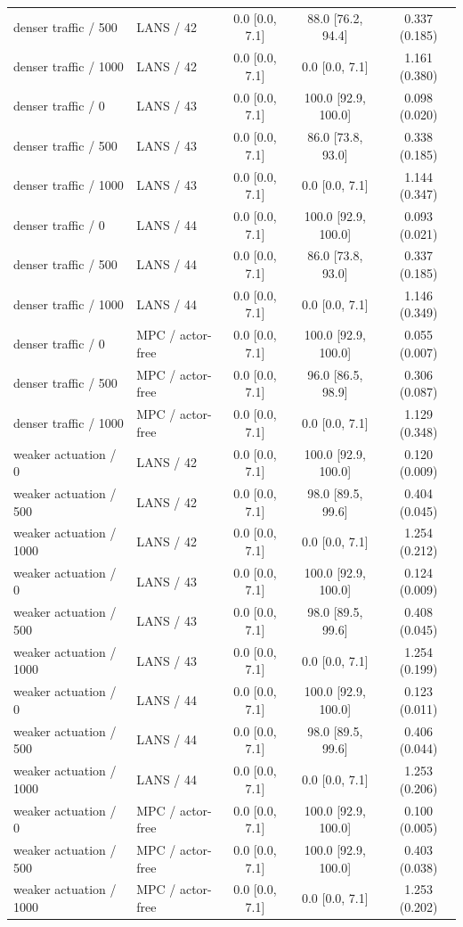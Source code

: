\begin{longtable}{llccc}
denser traffic / 500 & LANS / 42 & 0.0 [0.0, 7.1] & 88.0 [76.2, 94.4] & 0.337 (0.185) \\
denser traffic / 1000 & LANS / 42 & 0.0 [0.0, 7.1] & 0.0 [0.0, 7.1] & 1.161 (0.380) \\
denser traffic / 0 & LANS / 43 & 0.0 [0.0, 7.1] & 100.0 [92.9, 100.0] & 0.098 (0.020) \\
denser traffic / 500 & LANS / 43 & 0.0 [0.0, 7.1] & 86.0 [73.8, 93.0] & 0.338 (0.185) \\
denser traffic / 1000 & LANS / 43 & 0.0 [0.0, 7.1] & 0.0 [0.0, 7.1] & 1.144 (0.347) \\
denser traffic / 0 & LANS / 44 & 0.0 [0.0, 7.1] & 100.0 [92.9, 100.0] & 0.093 (0.021) \\
denser traffic / 500 & LANS / 44 & 0.0 [0.0, 7.1] & 86.0 [73.8, 93.0] & 0.337 (0.185) \\
denser traffic / 1000 & LANS / 44 & 0.0 [0.0, 7.1] & 0.0 [0.0, 7.1] & 1.146 (0.349) \\
denser traffic / 0 & MPC / actor-free & 0.0 [0.0, 7.1] & 100.0 [92.9, 100.0] & 0.055 (0.007) \\
denser traffic / 500 & MPC / actor-free & 0.0 [0.0, 7.1] & 96.0 [86.5, 98.9] & 0.306 (0.087) \\
denser traffic / 1000 & MPC / actor-free & 0.0 [0.0, 7.1] & 0.0 [0.0, 7.1] & 1.129 (0.348) \\
weaker actuation / 0 & LANS / 42 & 0.0 [0.0, 7.1] & 100.0 [92.9, 100.0] & 0.120 (0.009) \\
weaker actuation / 500 & LANS / 42 & 0.0 [0.0, 7.1] & 98.0 [89.5, 99.6] & 0.404 (0.045) \\
weaker actuation / 1000 & LANS / 42 & 0.0 [0.0, 7.1] & 0.0 [0.0, 7.1] & 1.254 (0.212) \\
weaker actuation / 0 & LANS / 43 & 0.0 [0.0, 7.1] & 100.0 [92.9, 100.0] & 0.124 (0.009) \\
weaker actuation / 500 & LANS / 43 & 0.0 [0.0, 7.1] & 98.0 [89.5, 99.6] & 0.408 (0.045) \\
weaker actuation / 1000 & LANS / 43 & 0.0 [0.0, 7.1] & 0.0 [0.0, 7.1] & 1.254 (0.199) \\
weaker actuation / 0 & LANS / 44 & 0.0 [0.0, 7.1] & 100.0 [92.9, 100.0] & 0.123 (0.011) \\
weaker actuation / 500 & LANS / 44 & 0.0 [0.0, 7.1] & 98.0 [89.5, 99.6] & 0.406 (0.044) \\
weaker actuation / 1000 & LANS / 44 & 0.0 [0.0, 7.1] & 0.0 [0.0, 7.1] & 1.253 (0.206) \\
weaker actuation / 0 & MPC / actor-free & 0.0 [0.0, 7.1] & 100.0 [92.9, 100.0] & 0.100 (0.005) \\
weaker actuation / 500 & MPC / actor-free & 0.0 [0.0, 7.1] & 100.0 [92.9, 100.0] & 0.403 (0.038) \\
weaker actuation / 1000 & MPC / actor-free & 0.0 [0.0, 7.1] & 0.0 [0.0, 7.1] & 1.253 (0.202) \\
\bottomrule
\end{longtable}
